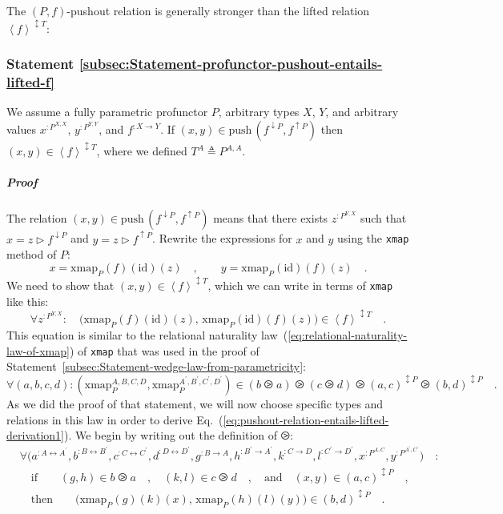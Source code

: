 The $\left(P,f\right)$-pushout relation is generally stronger than
the lifted relation $\left<f\right>^{\updownarrow T}$:

\subsubsection{Statement \label{subsec:Statement-profunctor-pushout-entails-lifted-f}\ref{subsec:Statement-profunctor-pushout-entails-lifted-f}}

We assume a fully parametric profunctor $P$, arbitrary types $X$,
$Y$, and arbitrary values $x^{:P^{X,X}}$, $y^{:P^{Y,Y}}$, and $f^{:X\rightarrow Y}$.
If $(x,y)\in\text{push}\,(f^{\downarrow P},f^{\uparrow P})$ then
$(x,y)\in\left<f\right>^{\updownarrow T}$, where we defined $T^{A}\triangleq P^{A,A}$.

\subparagraph{Proof}

The relation $(x,y)\in\text{push}\,(f^{\downarrow P},f^{\uparrow P})$
means that there exists $z^{:P^{Y,X}}$ such that $x=z\triangleright f^{\downarrow P}$
and $y=z\triangleright f^{\uparrow P}$. Rewrite the expressions for
$x$ and $y$ using the \lstinline!xmap! method of $P$:
\[
x=\text{xmap}_{P}(f)(\text{id})(z)\quad,\quad\quad y=\text{xmap}_{P}(\text{id})(f)(z)\quad.
\]
We need to show that $(x,y)\in\left<f\right>^{\updownarrow T}$, which
we can write in terms of \lstinline!xmap! like this:
\begin{equation}
\forall z^{:P^{Y,X}}:\quad\big(\text{xmap}_{P}(f)(\text{id})(z),\,\text{xmap}_{P}(\text{id})(f)(z)\big)\in\left<f\right>^{\updownarrow T}\quad.\label{eq:pushout-relation-entails-lifted-derivation1}
\end{equation}
This equation is similar to the relational naturality law~(\ref{eq:relational-naturality-law-of-xmap})
of \lstinline!xmap! that was used in the proof of Statement~\ref{subsec:Statement-wedge-law-from-parametricity}:
\[
\forall(a,b,c,d):(\text{xmap}_{P}^{A,B,C,D},\text{xmap}_{P}^{A^{\prime},B^{\prime},C^{\prime},D^{\prime}})\in(b\ogreaterthan a)\ogreaterthan(c\ogreaterthan d)\ogreaterthan(a,c)^{\updownarrow P}\ogreaterthan(b,d)^{\updownarrow P}\quad.
\]
As we did the proof of that statement, we will now choose specific
types and relations in this law in order to derive Eq.~(\ref{eq:pushout-relation-entails-lifted-derivation1}).
We begin by writing out the definition of $\ogreaterthan$:
\begin{align}
 & \forall\big(a^{:A\leftrightarrow A^{\prime}},b^{:B\leftrightarrow B^{\prime}},c^{:C\leftrightarrow C^{\prime}},d^{:D\leftrightarrow D^{\prime}},g^{:B\rightarrow A},h^{:B^{\prime}\rightarrow A^{\prime}},k^{:C\rightarrow D},l^{:C^{\prime}\rightarrow D^{\prime}},x^{:P^{A,C}},y^{:P^{A^{\prime},C^{\prime}}}\big)\quad:\nonumber \\
 & \quad\text{if}\quad\quad(g,h)\in b\ogreaterthan a\quad,\quad(k,l)\in c\ogreaterthan d\quad,\quad\text{and}\quad(x,y)\in(a,c)^{\updownarrow P}\quad,\nonumber \\
 & \quad\text{then}\quad\quad\big(\text{xmap}_{P}(g)(k)(x),\,\text{xmap}_{P}(h)(l)(y)\big)\in(b,d)^{\updownarrow P}\quad.\label{eq:xmap-relational-law-derivation3}
\end{align}

